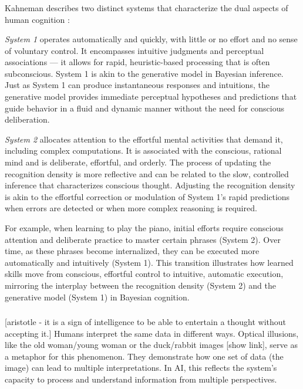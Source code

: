 \subsubsection{}
Kahneman describes two distinct systems that characterize the dual aspects of human cognition \cite{Kahneman11}:

\emph{System 1} operates automatically and quickly, with little or no effort and no sense of voluntary control. It encompasses intuitive judgments and perceptual associations — it allows for rapid, heuristic-based processing that is often subconscious.
System 1 is akin to the generative model in Bayesian inference. Just as System 1 can produce instantaneous responses and intuitions, the generative model provides immediate perceptual hypotheses and predictions that guide behavior in a fluid and dynamic manner without the need for conscious deliberation.

\emph{System 2} allocates attention to the effortful mental activities that demand it, including complex computations. It is associated with the conscious, rational mind and is deliberate, effortful, and orderly. 
The process of updating the recognition density is more reflective and can be related to the slow, controlled inference that characterizes conscious thought. Adjusting the recognition density is akin to the effortful correction or modulation of System 1's rapid predictions when errors are detected or when more complex reasoning is required.

For example, when learning to play the piano, initial efforts require conscious attention and deliberate practice to master certain phrases (System 2). Over time, as these phrases become internalized, they can be executed more automatically and intuitively (System 1). This transition illustrates how learned skills move from conscious, effortful control to intuitive, automatic execution, mirroring the interplay between the recognition density (System 2) and the generative model (System 1) in Bayesian cognition.





\subsubsection{}
[aristotle - it is a sign of intelligence to be able to entertain a thought without accepting it.]
Humans interpret the same data in different ways. 
Optical illusions, like the old woman/young woman or the duck/rabbit images [show link], serve as a metaphor for this phenomenon. They demonstrate how one set of data (the image) can lead to multiple interpretations. In AI, this reflects the system's capacity to process and understand information from multiple perspectives.

